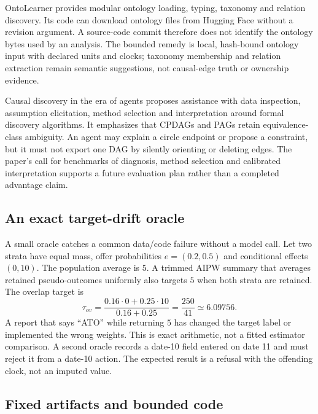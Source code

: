 OntoLearner provides modular ontology loading, typing, taxonomy and relation discovery. Its code can download ontology files from Hugging Face without a revision argument. A source-code commit therefore does not identify the ontology bytes used by an analysis. The bounded remedy is local, hash-bound ontology input with declared units and clocks; taxonomy membership and relation extraction remain semantic suggestions, not causal-edge truth or ownership evidence. \cite{exec13_data_ontolearner,exec13_data_ontolearner_code}

Causal discovery in the era of agents proposes assistance with data inspection, assumption elicitation, method selection and interpretation around formal discovery algorithms. It emphasizes that CPDAGs and PAGs retain equivalence-class ambiguity. An agent may explain a circle endpoint or propose a constraint, but it must not export one DAG by silently orienting or deleting edges. The paper's call for benchmarks of diagnosis, method selection and calibrated interpretation supports a future evaluation plan rather than a completed advantage claim. \cite{exec13_data_causaldiscovery}

\subsection{An exact target-drift oracle}

A small oracle catches a common data/code failure without a model call. Let two strata have equal mass, offer probabilities $e=(0.2,0.5)$ and conditional effects $(0,10)$. The population average is $5$. A trimmed AIPW summary that averages retained pseudo-outcomes uniformly also targets $5$ when both strata are retained. The overlap target is
\[
\tau_{ov}=\frac{0.16\cdot0+0.25\cdot10}{0.16+0.25}=\frac{250}{41}\simeq6.09756.
\]
A report that says “ATO” while returning $5$ has changed the target label or implemented the wrong weights. This is exact arithmetic, not a fitted estimator comparison. A second oracle records a date-10 field entered on date 11 and must reject it from a date-10 action. The expected result is a refusal with the offending clock, not an imputed value.

\subsection{Fixed artifacts and bounded code}

